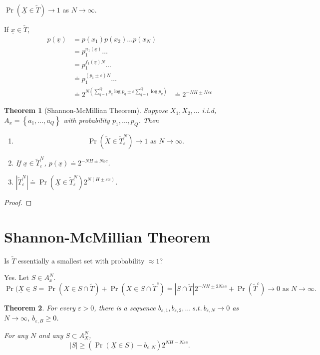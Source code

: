 \documentclass{report}
\newcommand{\st}{\ s.t.\ }
\newcommand{\set}[1]{\left\lbrace #1 \right\rbrace}
\newtheorem{theorem}{Theorem}[section]
\theoremstyle{definition}
\theoremstyle{remark}
\numberwithin{equation}{section}
\begin{document}
$\Pr(\underline{X} \in \tilde{T}) \to 1$ as $N \to \infty$.

If $\underline{x} \in \tilde{T}$, \begin{align*}
  p(\underline{x}) & = p(x_1)p(x_2)\ldots p(x_N) \\
  & = p_1^{n_1(\underline{x})}\ldots \\
  & = p_1^{f_1(\underline{x})N}\ldots \\
  & \doteq p_1^{(p_1 \pm \varepsilon)N}\ldots \\
  & \doteq 2^{N\left(\sum_{q=1}^Q p_q\log p_q \pm \varepsilon \sum_{q=1}^Q\log p_q\right)}
  & \doteq 2^{-NH \pm N\varepsilon c}
\end{align*}

\begin{theorem}[Shannon-McMillian Theorem]
  Suppose $X_1, X_2, \ldots$ i.i.d, $A_x = \set{a_1, \ldots, a_Q}$ with probability $p_1, \ldots, p_Q$. Then \begin{enumerate}
    \item  \[ \Pr(\tilde{X} \in \tilde{T}_\varepsilon^N) \to 1 \text{ as } N \to \infty. \]
    \item If $\underline{x} \in \tilde{T}_\varepsilon^N$, $p(\underline{x}) \doteq 2^{-NH \pm N\varepsilon c}$.
    \item $\left|\tilde{T}_\varepsilon^N\right| \doteq \Pr(\underline{X} \in \tilde{T}_\varepsilon^N)2^{N(H \pm \varepsilon x)}$.
  \end{enumerate}
\end{theorem}
\begin{proof}
\end{proof}

\section{Shannon-McMillian Theorem}

Is $\tilde{T}$ essentially a smallest set with probability $\approx 1$?

Yes. Let $S \in A_x^N$. \[
  \Pr(\underline{X} \in S = \Pr(X \in S \cap \tilde{T}) + \Pr(X \in S \cap \tilde{T}^c) \ddot{=} |S \cap \tilde{T}|2^{-NH \pm 2N\varepsilon c} + \Pr(\tilde{T}^c) \to 0 \text{ as } N \to \infty.  
\]

\begin{theorem}
  For every $\varepsilon > 0$, there is a sequence $b_{\varepsilon,1}, b_{\varepsilon,2}, \ldots \st b_{\varepsilon, N} \to 0$ as $N \to \infty$, $b_{\varepsilon, B} \geq 0$.

  For any $N$ and any $S \subset A_X^N$, \[
    |S| \geq \left(\Pr(\underline{X}\in S) - b_{\varepsilon, N}\right)2^{NH - N\varepsilon c}.  
  \]
\end{theorem}
\end{document}
